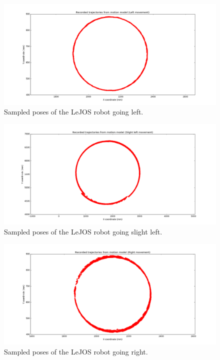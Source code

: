 \documentclass[paper=a4, fontsize=11pt]{scrartcl} %
\begin{document}
    \begin{figure}[h!]
	\begin{center}
		\setlength{\fboxsep}{0.5pt} %
		\setlength{\fboxrule}{0.5pt}
		\includegraphics[width=12cm,fbox]{images/raw_left.png}
		\caption{Sampled poses of the LeJOS robot going left.}
	\end{center}
\end{figure}

    \begin{figure}[h!]
	\begin{center}
		\setlength{\fboxsep}{0.5pt} %
		\setlength{\fboxrule}{0.5pt}
		\includegraphics[width=12cm,fbox]{images/raw_slightLeft.png}
		\caption{Sampled poses of the LeJOS robot going slight left.}
	\end{center}
	\end{figure}

    \begin{figure}[h!]
	\begin{center}
		\setlength{\fboxsep}{0.5pt} %
		\setlength{\fboxrule}{0.5pt}
		\includegraphics[width=12cm,fbox]{images/raw_right.png}
		\caption{Sampled poses of the LeJOS robot going right.}
	\end{center}
	\end{figure}
    
\end{document}
